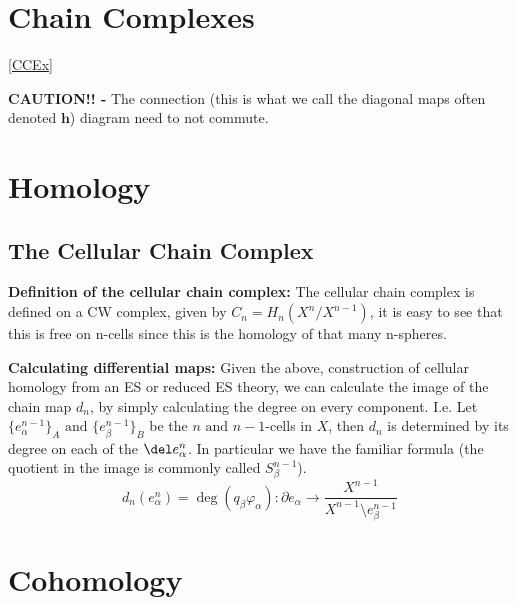 \documentclass[11pt]{article}
\theoremstyle{definition}
\newcommand{\set}[1]{\{#1\}}
\newcommand{\tand}{\text{ and }}
\begin{document}
    \section{Chain Complexes}\label{CCNotes} \ref{CCEx}

    \textbf{CAUTION!! - } The connection (this is what we call the diagonal maps often denoted \(\mathbf{h}\)) diagram need to not commute.

    \section{Homology}

    \subsection{The Cellular Chain Complex}

    \textbf{Definition of the cellular chain complex: } The cellular chain complex is defined on a CW complex, given by \(C_n = H_n(X^n/X^{n-1})\), 
    it is easy to see that this is free on n-cells since this is the homology of that many n-spheres.

    \textbf{Calculating differential maps: } Given the above, construction of cellular homology from an ES or reduced ES theory, we can calculate the image of the
    chain map \(d_n\), by simply calculating the degree on every component. I.e. Let \(\set{e_\alpha^{n-1}}_A \tand \set{e_\beta^{n-1}}_B\) be the \(n \tand n-1\)-cells in \(X\), 
    then \(d_n\) is determined by its degree on each of the \(\del e_\alpha^n\). In particular we have the familiar formula (the quotient in the image is commonly called \(S^{n-1}_\beta\)).
    \[d_n (e^n_\alpha) = \deg (q_\beta\varphi_\alpha): \partial e_\alpha \to \frac{X^{n-1}}{X^{n-1} \setminus e^{n-1}_\beta}\]

    \section{Cohomology}
\end{document}
